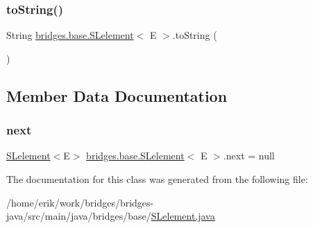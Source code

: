 \subsubsection{\texorpdfstring{to\+String()}{toString()}}
{\footnotesize\ttfamily String \hyperlink{classbridges_1_1base_1_1_s_lelement}{bridges.\+base.\+S\+Lelement}$<$ E $>$.to\+String (\begin{DoxyParamCaption}{ }\end{DoxyParamCaption})}



\subsection{Member Data Documentation}
\mbox{\label{classbridges_1_1base_1_1_s_lelement_abf61c96a74ad319d561c6952ea388e0e}} 
\subsubsection{\texorpdfstring{next}{next}}
{\footnotesize\ttfamily \hyperlink{classbridges_1_1base_1_1_s_lelement}{S\+Lelement}$<$E$>$ \hyperlink{classbridges_1_1base_1_1_s_lelement}{bridges.\+base.\+S\+Lelement}$<$ E $>$.next = null\hspace{0.3cm}{\ttfamily [protected]}}



The documentation for this class was generated from the following file\+:\begin{DoxyCompactItemize}
\item 
/home/erik/work/bridges/bridges-\/java/src/main/java/bridges/base/\hyperlink{_s_lelement_8java}{S\+Lelement.\+java}\end{DoxyCompactItemize}

